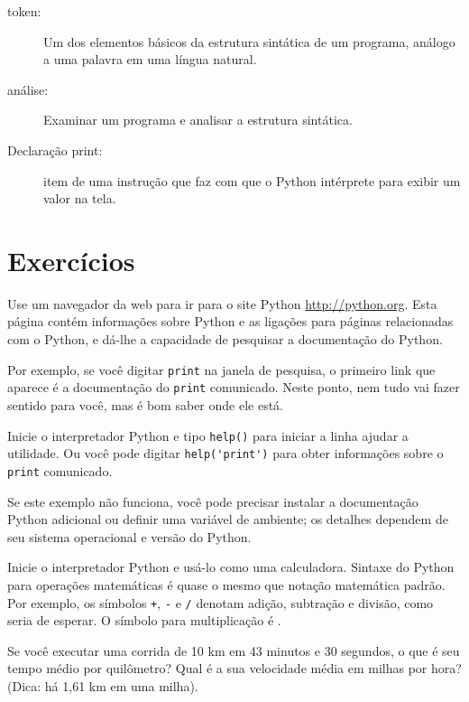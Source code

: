 \documentclass[10pt]{book}
\begin{document}
\begin{description}
\item[token:] Um dos elementos básicos da estrutura sintática de
um programa, análogo a uma palavra em uma língua natural.

\item[análise:] Examinar um programa e analisar a estrutura sintática.

\item[Declaração print:] item de uma instrução que faz com que o Python
intérprete para exibir um valor na tela.


\end{description}


\section{Exercícios}

\begin{exercise}

Use um navegador da web para ir para o site Python \url{http://python.org}.
Esta página contém informações sobre Python e as ligações
para páginas relacionadas com o Python, e dá-lhe a capacidade de pesquisar
a documentação do Python.

Por exemplo, se você digitar {\tt print} na janela de pesquisa, o
primeiro link que aparece é a documentação do {\tt print}
comunicado. Neste ponto, nem tudo vai fazer sentido para você,
mas é bom saber onde ele está.

\end{exercise}

\begin{exercise}

Inicie o interpretador Python e tipo {\tt help()} para iniciar a linha
ajudar a utilidade. Ou você pode digitar \verb"help('print')" para obter informações
sobre o {\tt print} comunicado.

Se este exemplo não funciona, você
pode precisar instalar a documentação Python adicional ou definir uma
variável de ambiente; os detalhes dependem de seu sistema operacional e
versão do Python.

\end{exercise}

\begin{exercise}

Inicie o interpretador Python e usá-lo como uma calculadora.
Sintaxe do Python para operações matemáticas é quase o mesmo que
notação matemática padrão. Por exemplo, os símbolos
{\tt +}, {\tt -} e {\tt /} denotam adição, subtração
e divisão, como seria de esperar. O símbolo para
multiplicação é {\tt *}.

Se você executar uma corrida de 10 km em 43 minutos e 30 segundos, o que é seu
tempo médio por quilômetro? Qual é a sua velocidade média em milhas por hora?
(Dica: há 1,61 km em uma milha).

\end{exercise}
\end{document}
